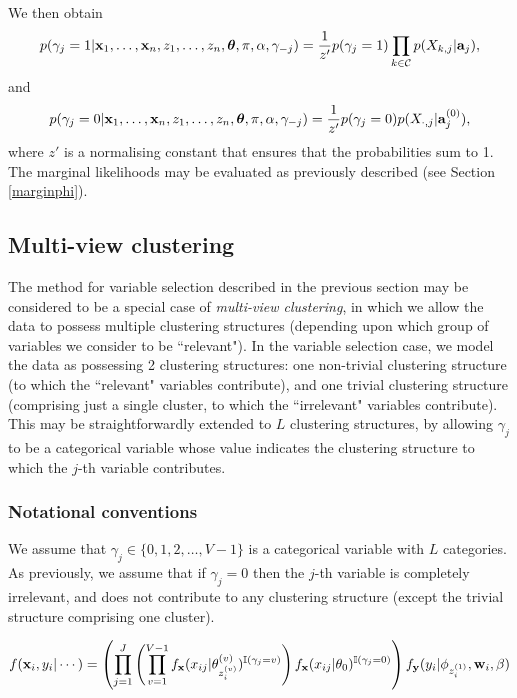 \documentclass[12pt]{article}
\begin{document}
We then obtain 
\begin{equation}
p(\gamma_j = 1|{\bf x}_1,\ldots, {\bf x}_n,z_1, \ldots, z_n, \boldsymbol{\theta}, \pi, \alpha, \gamma_{-j}) = \frac{1}{z'} p(\gamma_j = 1)\prod_{k\in \mathcal{C}}  p(X_{k,j}|{\bf a}_j),\label{gammacond3a}
\end{equation}
and
\begin{equation}
p(\gamma_j = 0|{\bf x}_1,\ldots, {\bf x}_n,z_1, \ldots, z_n, \boldsymbol{\theta}, \pi, \alpha, \gamma_{-j}) = \frac{1}{z'}p(\gamma_j = 0)p(X_{\cdot,j}|{\bf a}_j^{(0)}),\label{gammacond3b}
\end{equation}
where $z'$ is a normalising constant that ensures that the probabilities sum to 1.  The marginal likelihoods may be evaluated as previously described (see Section \ref{marginphi}).  

\subsection{Multi-view clustering}\label{multiview}
The method for variable selection described in the previous section may be considered to be a special case of {\em multi-view clustering}, in which we allow the data to possess multiple clustering structures (depending upon which group of variables we consider to be ``relevant").  In the variable selection case, we model the data as possessing 2 clustering structures: one non-trivial clustering structure (to which the ``relevant" variables contribute), and one trivial clustering structure (comprising just a single cluster, to which the ``irrelevant" variables contribute).  This may be straightforwardly extended to $L$ clustering structures, by allowing $\gamma_j$ to be a categorical variable whose value indicates the clustering structure to which the $j$-th variable contributes. 

\subsubsection{Notational conventions}     
We assume that $\gamma_j \in \{0, 1, 2, \ldots, V-1\}$ is a categorical variable with $L$ categories.  As previously, we assume that if $\gamma_j=0$ then the $j$-th variable is completely irrelevant, and does not contribute to any clustering structure (except the trivial structure comprising one cluster).  

\begin{align*}
f({\bf x}_i, y_i | \cdots) &= \left(\prod_{j=1}^J\left(\prod_{v=1}^{V-1} f_{\bf x}( x_{ij} | \theta^{(v)}_{z_i^{(v)}})^{\mathbb{I}(\gamma_j = v)}\right)f_{\bf x}( x_{ij} | \theta_{0})^{\mathbb{I}(\gamma_j = 0)}\right)f_{\bf y}({ y}_i | \phi_{z_i^{(1)}}, {\bf w}_i, \beta)\\
\end{align*}
\end{document}

